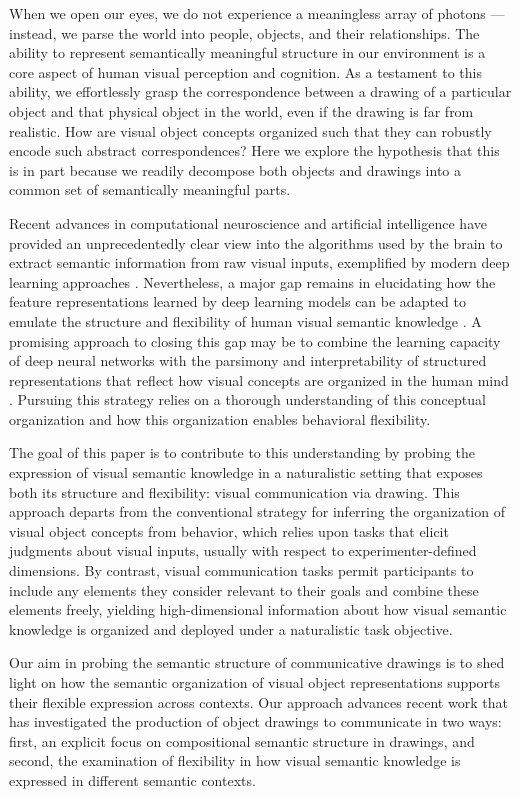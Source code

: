 \documentclass[10pt,letterpaper]{article}
\begin{document}
When we open our eyes, we do not experience a meaningless array of photons --- instead, we parse the world into people, objects, and their relationships. 
The ability to represent semantically meaningful structure in our environment is a core aspect of human visual perception and cognition. 
As a testament to this ability, we effortlessly grasp the correspondence between a drawing of a particular object and that physical object in the world, even if the drawing is far from realistic. 
How are visual object concepts organized such that they can robustly encode such abstract correspondences?
Here we explore the hypothesis that this is in part because we readily decompose both objects and drawings into a common set of semantically meaningful parts. 

Recent advances in computational neuroscience and artificial intelligence have provided an unprecedentedly clear view into the algorithms used by the brain to extract semantic information from raw visual inputs, exemplified by modern deep learning approaches \cite{yamins2014performance}.
Nevertheless, a major gap remains in elucidating how the feature representations learned by deep learning models can be adapted to emulate the structure and flexibility of human visual semantic knowledge \cite{lake2017building}.
A promising approach to closing this gap may be to combine the learning capacity of deep neural networks with the parsimony and interpretability of structured representations that reflect how visual concepts are organized in the human mind \cite{battaglia2018relational}. 
Pursuing this strategy relies on a thorough understanding of this conceptual organization and how this organization enables behavioral flexibility.  

The goal of this paper is to contribute to this understanding by probing the expression of visual semantic knowledge in a naturalistic setting that exposes both its structure and flexibility: visual communication via drawing.
This approach departs from the conventional strategy for inferring the organization of visual object concepts from behavior, which relies upon tasks that elicit judgments about visual inputs, usually with respect to experimenter-defined dimensions. 
By contrast, visual communication tasks permit participants to include any elements they consider relevant to their goals and combine these elements freely, yielding high-dimensional information about how visual semantic knowledge is organized and deployed under a naturalistic task objective. 

Our aim in probing the semantic structure of communicative drawings is to shed light on how the semantic organization of visual object representations supports their flexible expression across contexts. 
Our approach advances recent work \cite{FanCommon2018,long2018drawings} that has investigated the production of object drawings to communicate in two ways: first, an explicit focus on compositional semantic structure in drawings, and second, the examination of flexibility in how visual semantic knowledge is expressed in different semantic contexts. 
\end{document}
